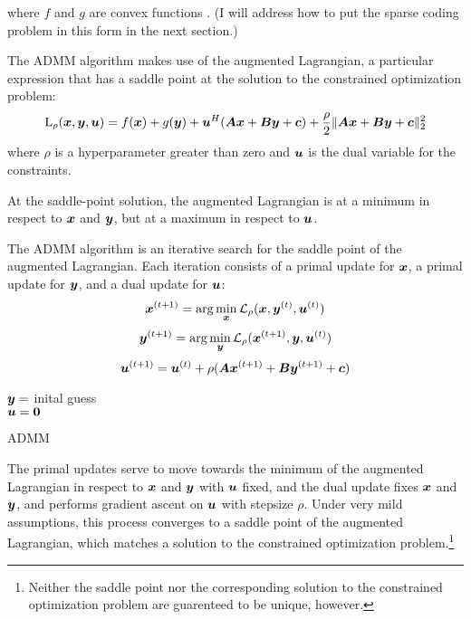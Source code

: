 where $f$ and $g$ are convex functions \cite{boyd2011distributed}. (I will address how to put the sparse coding problem in this form in the next section.)

The ADMM algorithm makes use of the augmented Lagrangian, a particular expression that has a saddle point at the solution to the constrained optimization problem:
%
\begin{equation}
\operatorname{L}_{\rho}(\bm{x},\bm{y},\bm{u}) = f(\bm{x}) + g(\bm{y}) + \bm{u}^H(\bm{A}\bm{x} + \bm{B}\bm{y} + \bm{c}) + \frac{\rho}{2}\|\bm{A}\bm{x} + \bm{B}\bm{y} + \bm{c}\|_2^2
\end{equation}
%
where $\rho$ is a hyperparameter greater than zero and $\bm{u}$ is the dual variable for the constraints.

At the saddle-point solution, the augmented Lagrangian is at a minimum in respect to $\bm{x}$ and $\bm{y}$, but at a maximum in respect to $\bm{u}$.

The ADMM algorithm is an iterative search for the saddle point of the augmented Lagrangian. Each iteration consists of a primal update for $\bm{x}$, a primal update for $\bm{y}$, and a dual update for $\bm{u}$:
%
\begin{equation}
\bm{x}^{(t + 1)} = \arg\min_{\bm{x}} \mathcal{L}_{\rho}(\bm{x},\bm{y}^{(t)},\bm{u}^{(t)})
\end{equation}
%
\begin{equation}
\bm{y}^{(t + 1)} = \arg\min_{\bm{y}} \mathcal{L}_{\rho}(\bm{x}^{(t + 1)},\bm{y},\bm{u}^{(t)})
\end{equation}
%
\begin{equation} \label{equation:general dual update}
\bm{u}^{(t + 1)} = \bm{u}^{(t)} + \rho(\bm{A}\bm{x}^{(t + 1)} + \bm{B}\bm{y}^{(t + 1)} + \bm{c})
\end{equation}
%
\begin{algorithm}[H]
\SetAlgoLined
   $\bm{y} = $ inital guess \\
   $\bm{u} = \bm{0}$ \\
 \caption{ADMM}
\end{algorithm}

The primal updates serve to move towards the minimum of the augmented Lagrangian in respect to $\bm{x}$ and $\bm{y}$ with $\bm{u}$ fixed, and the dual update fixes $\bm{x}$ and $\bm{y}$, and performs gradient ascent on $\bm{u}$ with stepsize $\rho$. Under very mild assumptions, this process converges to a saddle point of the augmented Lagrangian, which matches a solution to the constrained optimization problem.\footnote{Neither the saddle point nor the corresponding solution to the constrained optimization problem are guarenteed to be unique, however.}

